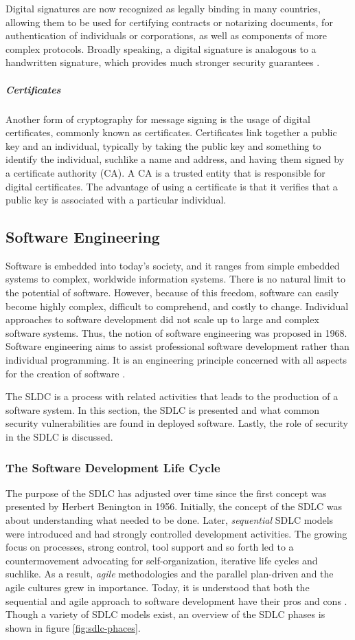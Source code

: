 Digital signatures are now recognized as legally binding in many countries, allowing them to be used for certifying contracts or notarizing documents, for authentication of individuals or corporations, as well as components of more complex protocols. Broadly speaking, a digital signature is analogous to a handwritten signature, which provides much stronger security guarantees \cite{katz2010digital}. 

\subparagraph{Certificates}
Another form of cryptography for message signing is the usage of digital certificates, commonly known as certificates. Certificates link together a public key and an individual, typically by taking the public key and something to identify the individual, suchlike a name and address, and having them signed by a certificate authority (CA). A CA is a trusted entity that is responsible for digital certificates. The advantage of using a certificate is that it verifies that a public key is associated with a particular individual.

\subsection{Software Engineering}
Software is embedded into today's society, and it ranges from simple embedded systems to complex, worldwide information systems. There is no natural limit to the potential of software. However, because of this freedom, software can easily become highly complex, difficult to comprehend, and costly to change. Individual approaches to software development did not scale up to large and complex software systems. Thus, the notion of software engineering was proposed in 1968. Software engineering aims to assist professional software development rather than individual programming. It is an engineering principle concerned with all aspects for the creation of software \cite{book:se_sommervile_2021}.

The SLDC is a process with related activities that leads to the production of a software system. In this section, the SDLC is presented and what common security vulnerabilities are found in deployed software. Lastly, the role of security in the SDLC is discussed. 

\subsubsection{The Software Development Life Cycle}
The purpose of the SDLC has adjusted over time since the first concept was presented by Herbert Benington in 1956. Initially, the concept of the SDLC was about understanding what needed to be done. Later, \textit{sequential} SDLC models were introduced and had strongly controlled development activities. The growing focus on processes, strong control, tool support and so forth led to a countermovement advocating for self-organization, iterative life cycles and suchlike. As a result, \textit{agile} methodologies and the parallel plan-driven and the agile cultures grew in importance. Today, it is understood that both the sequential and agile approach to software development have their pros and cons \cite{Kneuper_2017}. Though a variety of SDLC models exist, an overview of the SDLC phases is shown in figure \ref{fig:sdlc-phaces}.

